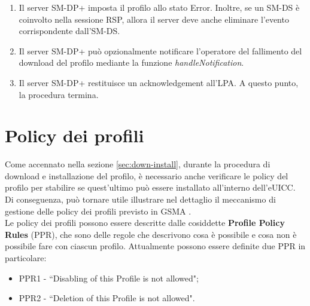 \documentclass[10pt, oneside]{book}
\begin{document}
\begin{enumerate}
\item Il server SM-DP+ imposta il profilo allo stato Error. Inoltre, se un SM-DS è coinvolto nella sessione RSP, allora il server deve anche eliminare l'evento corrispondente dall'SM-DS.
\item Il server SM-DP+ può opzionalmente notificare l'operatore del fallimento del download del profilo mediante la funzione \textit{handleNotification}.
\item Il server SM-DP+ restituisce un acknowledgement all'LPA. A questo punto, la procedura termina.
\end{enumerate}

\section{Policy dei profili}\label{sec:profile-policy}
Come accennato nella sezione \ref{sec:down-install}, durante la procedura di download e installazione del profilo, è necessario anche verificare le policy del profilo per stabilire se quest'ultimo può essere installato all'interno dell'eUICC. Di conseguenza, può tornare utile illustrare nel dettaglio il meccanismo di gestione delle policy dei profili previsto in GSMA \cite{GSMA-docs-new}.\\
Le policy dei profili possono essere descritte dalle cosiddette \textbf{Profile Policy Rules} (PPR), che sono delle regole che descrivono cosa è possibile e cosa non è possibile fare con ciascun profilo. Attualmente possono essere definite due PPR in particolare:
\begin{itemize}
\item PPR1 - ``Disabling of this Profile is not allowed";
\item PPR2 - ``Deletion of this Profile is not allowed".
\end{itemize}
\end{document}
